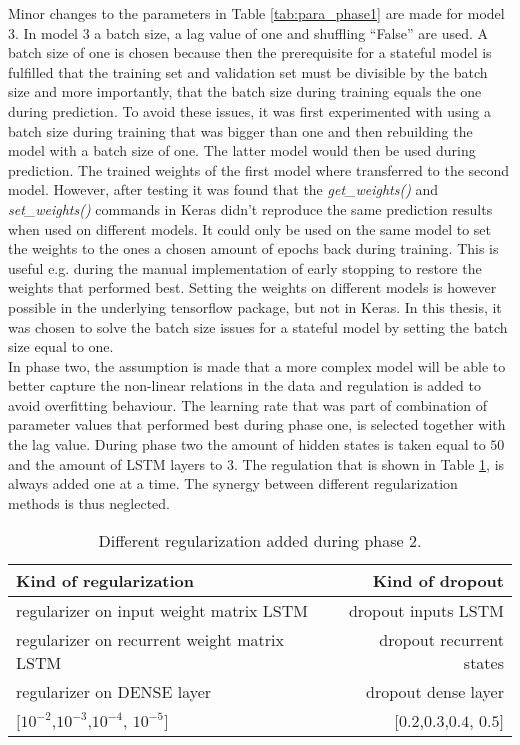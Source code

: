 Minor changes to the parameters in Table \ref{tab:para_phase1} are made for model $ 3 $. In model $ 3 $ a batch size, a lag value of one and shuffling ``False'' are used. A batch size of one is chosen because then the prerequisite for a stateful model is fulfilled that the training set and validation set must be divisible by the batch size and more importantly, that the batch size during training equals the one during prediction. To avoid these issues, it was first experimented with using a batch size during training that was bigger than one and then rebuilding the model with a batch size of one. The latter model would then be used during prediction. The trained weights of the first model where transferred to the second model. However, after testing it was found that the \textit{get\_weights()} and \textit{set\_weights()} commands in Keras didn't reproduce the same prediction results when used on different models. It could only be used on the same model to set the weights to the ones a chosen amount of epochs back during training. This is useful e.g. during the manual implementation of early stopping to restore the weights that performed best. Setting the weights on different models is however possible in the underlying tensorflow package, but not in Keras. In this thesis, it was chosen to solve the batch size issues for a stateful model by setting the batch size equal to one.\\

In phase two, the assumption is made that a more complex model will be able to better capture the non-linear relations in the data and regulation is added to avoid overfitting behaviour. The learning rate that was part of combination of parameter values that performed best during phase one, is selected together with the lag value. During phase two the amount of hidden states is taken equal to $ 50 $ and the amount of LSTM layers to $ 3 $. The regulation that is shown in Table \ref{tab:regulation}, is always added one at a time. The synergy between different regularization methods is thus neglected. 

\begin{table}[ht]
	\centering
	\begin{tabular}{@{}l|r@{}} \toprule
		\textbf{Kind of regularization} & 	\textbf{Kind of dropout}\\\midrule
		regularizer on input weight matrix LSTM 	& dropout inputs LSTM\\\hline
		regularizer on recurrent weight matrix LSTM & dropout recurrent states\\\hline
		regularizer on DENSE layer & dropout dense layer\\\hline
		$[ 10^{-2} $,$ 10^{-3} $,$ 10^{-4}$, $ 10^{-5} ]$ & $[ 0.2 $,$ 0.3 $,$ 0.4$, $ 0.5 ]$\\\bottomrule
\end{tabular}
\caption{Different regularization added during phase 2.}
\label{tab:regulation}
\end{table}


